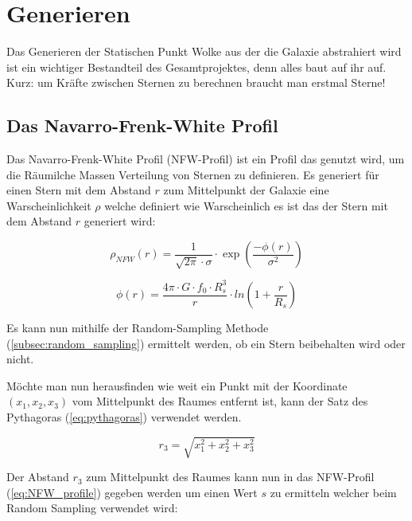 \section{Generieren}

Das Generieren der Statischen Punkt Wolke aus der die Galaxie abstrahiert wird
ist ein wichtiger Bestandteil des Gesamtprojektes, denn alles baut auf ihr auf.
Kurz: um Kräfte zwischen Sternen zu berechnen braucht man erstmal Sterne!

\subsection{Das Navarro-Frenk-White Profil}
Das Navarro-Frenk-White Profil (NFW-Profil) ist ein Profil das genutzt wird, um
die Räumilche Massen Verteilung von Sternen zu definieren. Es generiert für
einen Stern mit dem Abstand \( r \) zum Mittelpunkt der Galaxie eine
Warscheinlichkeit \( \rho \) welche definiert wie Warscheinlich es ist das der
Stern mit dem Abstand \( r \) generiert wird:

\begin{equation} \label{eq:NFW_profile}
  \rho_{NFW}(r) = \frac{ 1 }{ \sqrt{ 2 \pi } \cdot \sigma } \cdot
  \exp \left( \frac{ -\phi(r) }{ \sigma^{ 2 } } \right)
\end{equation}

\begin{equation*}
  \phi(r) = \frac{ 4\pi \cdot G \cdot f_{0} \cdot R_{s}^3 }{ r } \cdot
  ln{ \left( 1 + \frac{ r }{ R_{s} } \right) }
\end{equation*}

Es kann nun mithilfe der Random-Sampling Methode (\ref{subsec:random_sampling})
ermittelt werden, ob ein Stern beibehalten wird oder nicht.\\

\par Möchte man nun herausfinden wie weit ein Punkt mit der Koordinate \(
(x_{1}, x_{2}, x_{3}) \) vom Mittelpunkt des Raumes entfernt ist, kann der Satz
des Pythagoras (\ref{eq:pythagoras}) verwendet werden.

\begin{equation} \label{eq:pythagoras}
    r_{3} = \sqrt{x_{1}^{2} + x_{2}^{2} + x_{3}^{2} }
\end{equation}

Der Abstand \( r_{3} \) zum Mittelpunkt des Raumes kann nun in das NFW-Profil
(\ref{eq:NFW_profile}) gegeben werden um einen Wert \( s \) zu ermitteln welcher
beim Random Sampling verwendet wird:

